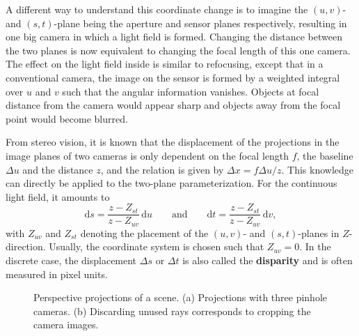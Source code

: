 A different way to understand this coordinate change is to imagine the $(u, v)$- and $(s, t)$-plane being the aperture and sensor planes respectively, resulting in one big camera in which a light field is formed.
Changing the distance between the two planes is now equivalent to changing the focal length of this one camera.
The effect on the light field inside is similar to refocusing, except that in a conventional camera, the image on the sensor is formed by a weighted integral over $u$ and $v$ such that the angular information vanishes.
Objects at focal distance from the camera would appear sharp and objects away from the focal point would become blurred.

From stereo vision, it is known that the displacement of the projections in the image planes of two cameras is only dependent on the focal length $f$, the baseline $\Delta u$ and the distance $z$, and the relation is given by $\Delta x = f \Delta u / z$.
This knowledge can directly be applied to the two-plane parameterization. 
For the continuous light field, it amounts to
\begin{equation}\label{eq:disparity_for_two_plane_parameterization}
	\textrm{d}s = \frac{z - Z_{st}}{z - Z_{uv}} \, \textrm{d}u 
	\qquad
	\text{and} 
	\qquad
	\textrm{d}t = \frac{z - Z_{st}}{z - Z_{uv}} \, \textrm{d}v,
\end{equation}
with $Z_{uv}$ and $Z_{st}$ denoting the placement of the $(u, v)$- and \mbox{$(s, t)$-planes} in \mbox{$Z$-direction}.
Usually, the coordinate system is chosen such that $Z_{uv} = 0$.
In the discrete case, the displacement $\Delta s$ or $\Delta t$ is also called the \textbf{disparity} and is often measured in pixel units.

\begin{figure}[tb]
	\subcaptionbox{\label{fig:ShiftedPerspectiveProjection}}{}\hfill%
	\subcaptionbox{\label{fig:RectifiedPerspectiveProjection}}{}
	\caption[Parameterization for light fields from perspective projections]
			{Perspective projections of a scene. 
			 (a) Projections with three pinhole cameras. 
			 (b) Discarding unused rays corresponds to cropping the camera images.}
\end{figure}


